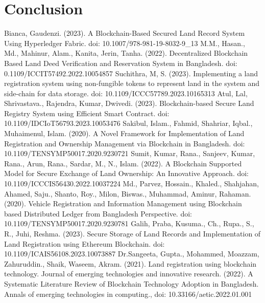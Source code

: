 \documentclass[conference]{IEEEtran}
\begin{document}
\section{Conclusion}

\begin{thebibliography}{00}
 Bianca, Gaudenzi. (2023). A Blockchain-Based Secured Land Record System Using Hyperledger Fabric.   doi: 10.1007/978-981-19-8032-9\_13
 M.M., Hasan., Md., Mahinur, Alam., Kanita, Jerin, Tanha. (2022). Decentralized Blockchain Based Land Deed Verification and Reservation System in Bangladesh.   doi: 0.1109/ICCIT57492.2022.10054857
 Suchithra, M, S. (2023). Implementing a land registration system using non-fungible tokens to represent land in the system and side-chain for data storage.   doi: 10.1109/ICCC57789.2023.10165313
 Atul, Lal, Shrivastava., Rajendra, Kumar, Dwivedi. (2023). Blockchain-based Secure Land Registry System using Efficient Smart Contract.   doi: 10.1109/IDCIoT56793.2023.10053476
 Sakibul, Islam., Fahmid, Shahriar, Iqbal., Muhaimenul, Islam. (2020). A Novel Framework for Implementation of Land Registration and Ownership Management via Blockchain in Bangladesh.   doi: 10.1109/TENSYMP50017.2020.9230721
 Sumit, Kumar, Rana., Sanjeev, Kumar, Rana., Arun, Rana., Sardar, M., N., Islam. (2022). A Blockchain Supported Model for Secure Exchange of Land Ownership: An Innovative Approach.   doi: 10.1109/ICCCIS56430.2022.10037224
 Md., Parvez, Hossain., Khaled., Shahjahan, Ahamed, Saju., Shanto, Roy., Milon, Biswas., Muhammad, Aminur, Rahaman. (2020). Vehicle Registration and Information Management using Blockchain based Distributed Ledger from Bangladesh Perspective.   doi: 10.1109/TENSYMP50017.2020.9230781
 Galih, Praba, Kusuma., Ch., Rupa., S., R., Juhi, Reshma. (2023). Secure Storage of Land Records and Implementation of Land Registration using Ethereum Blockchain.   doi: 10.1109/ICAIS56108.2023.10073887
 Dr.Sangeeta, Gupta., Mohammed, Moazzam, Zahuruddin., Shaik, Waseem, Akram. (2021). Land registration using blockchain technology. Journal of emerging technologies and innovative research.
 (2022). A Systematic Literature Review of Blockchain Technology Adoption in Bangladesh. Annals of emerging technologies in computing.,  doi: 10.33166/aetic.2022.01.001
\end{thebibliography}
\end{document}

